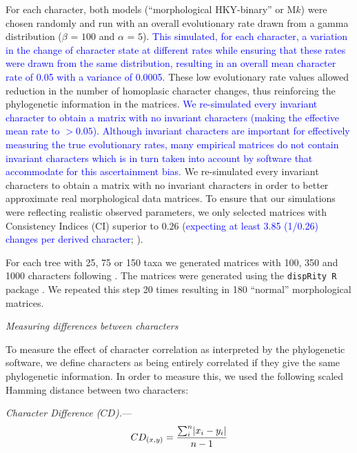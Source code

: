 \documentclass[12pt,letterpaper]{article}
\DeclarePairedDelimiter\abs{\lvert}{\rvert}%
\renewcommand{\subsection}[1]{%
\bigskip
\begin{center}
\begin{large}
\normalfont\itshape #1
\end{large}
\end{center}}
\renewcommand{\subsubsection}[1]{%
\vspace{2ex}
\noindent
\textit{#1.}---}
\begin{document}
\noindent For each character, both models (``morphological HKY-binary'' or M$k$) were chosen randomly and run with an overall evolutionary rate drawn from a gamma distribution ($\beta$ = $100$ and $\alpha$ = $5$).
\textcolor{blue}{This simulated, for each character, a variation in the change of character state at different rates while ensuring that these rates were drawn from the same distribution, resulting in an overall mean character rate of 0.05 with a variance of 0.0005.}
These low evolutionary rate values allowed reduction in the number of homoplasic character changes, thus reinforcing the phylogenetic information in the matrices.
\textcolor{blue}{We re-simulated every invariant character to obtain a matrix with no invariant characters (making the effective mean rate to $>0.05$).
Although invariant characters are important for effectively measuring the true evolutionary rates, many empirical matrices do not contain invariant characters which is in turn taken into account by software that accommodate for this ascertainment bias.}
We re-simulated every invariant characters to obtain a matrix with no invariant characters in order to better approximate real morphological data matrices.
To ensure that our simulations were reflecting realistic observed parameters, we only selected matrices with Consistency Indices (CI) superior to $0.26$ (\textcolor{blue}{expecting at least 3.85 (1/0.26) changes per derived character}; \citealt{sanderson1989patterns,OReilly20160081}).

For each tree with 25, 75 or 150 taxa we generated matrices with 100, 350 and 1000 characters following \cite{OReilly20160081}.
The matrices were generated using the \texttt{dispRity R} package \citep{thomas_guillerme_2016_55646}.
We repeated this step 20 times resulting in 180 ``normal'' morphological matrices.


\subsection{Measuring differences between characters}
\label{CDdescription}
To measure the effect of character correlation as interpreted by the phylogenetic software, we define characters as being entirely correlated if they give the same phylogenetic information.
In order to measure this, we used the following scaled Hamming distance between two characters:

\subsubsection{Character Difference ($CD$)}
\begin{equation}
    CD_{(x,y)} = \frac{\sum_{i}^{n}\abs{x_{i} - y_{i}}}{n-1}
\end{equation}
\end{document}
